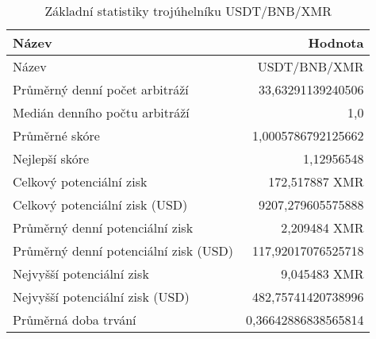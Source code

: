 \begin{table}\centering
\caption{Základní statistiky trojúhelníku USDT/BNB/XMR}
\label{USDTBNBXMR_stats}
\begin{tabular}{|| l | r ||}
\hline Název & Hodnota \\ 
\hline\hline Název & USDT/BNB/XMR \\ 
\hline Průměrný denní počet arbitráží & 33,63291139240506 \\ 
\hline Medián denního počtu arbitráží & 1,0 \\ 
\hline Průměrné skóre & 1,0005786792125662 \\ 
\hline Nejlepší skóre & 1,12956548 \\ 
\hline Celkový potenciální zisk & 172,517887 XMR \\ 
\hline Celkový potenciální zisk (USD) & 9207,279605575888 \\ 
\hline Průměrný denní potenciální zisk & 2,209484 XMR \\ 
\hline Průměrný denní potenciální zisk (USD) & 117,92017076525718 \\ 
\hline Nejvyšší potenciální zisk & 9,045483 XMR \\ 
\hline Nejvyšší potenciální zisk (USD) & 482,75741420738996 \\ 
\hline Průměrná doba trvání & 0,36642886838565814 \\ 
\hline
\end{tabular}
\end{table}